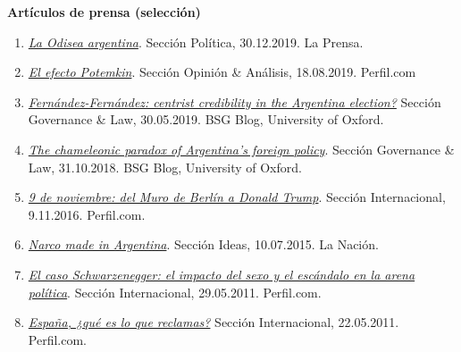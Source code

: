 \documentclass[12pt]{article}
\begin{document}
\begin{rSection}

{\bf Artículos de prensa (selección)}

\end{rSection}

\begin{enumerate}

\item \href{http://www.laprensa.com.ar/484388-La-odisea-argentina.note.aspx}{\it La Odisea argentina}. Sección Política, 30.12.2019. La Prensa.

\item \href{https://www.perfil.com/noticias/opinion/el-efecto-potemkin.phtml}{\it El efecto Potemkin}. Sección Opinión \& Análisis, 18.08.2019. Perfil.com

\item \href{https://blogs.bsg.ox.ac.uk/2019/05/30/fernandez-fernandez-centrist-credibility-in-the-argentina-election/}{\it Fernández-Fernández: centrist credibility in the Argentina election?} Sección Governance \& Law, 30.05.2019. BSG Blog, University of Oxford.

\item \href{https://blogs.bsg.ox.ac.uk/2018/10/31/the-chameleonic-paradox-of-argentinas-foreign-policy/}{\it The chameleonic paradox of Argentina’s foreign policy}. Sección Governance \& Law, 31.10.2018. BSG Blog, University of Oxford.

\item \href{https://www.perfil.com/noticias/internacional/9-de-noviembre-del-muro-de-berlin-al-eeuu-de-trump.phtml}{\it 9 de noviembre: del Muro de Berlín a Donald Trump}. Sección Internacional, 9.11.2016. Perfil.com.

\item \href{https://www.lanacion.com.ar/opinion/narco-made-in-argentina-nid1834560}{\it Narco made in Argentina}. Sección Ideas, 10.07.2015. La Nación.

\item \href{https://www.perfil.com/noticias/politica/el-caso-schwarzenegger-el-impacto-del-sexo-y-el-escandalo-en-la-arena-politica-20110529-0029.phtml}{\it El caso Schwarzenegger: el impacto del sexo y el escándalo en la arena política}. Sección Internacional, 29.05.2011. Perfil.com.

\item \href{https://www.perfil.com/noticias/internacional/espana-que-es-lo-que-reclamas-20110522-0005.phtml}{\it España, ¿qué es lo que reclamas?} Sección Internacional, 22.05.2011. Perfil.com.

\end{enumerate}
\end{document}
